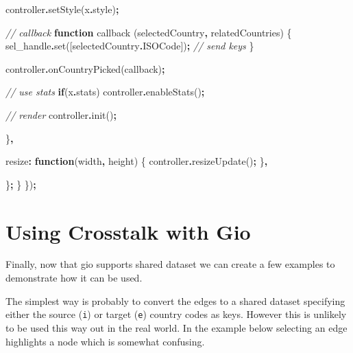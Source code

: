 \documentclass[
]{krantz}
\makeatletter
\newenvironment{Shaded}{\begin{snugshade}}{\end{snugshade}}
\newcommand{\AttributeTok}[1]{\textcolor[rgb]{0.61,0.61,0.61}{#1}}
\newcommand{\CommentTok}[1]{\textcolor[rgb]{0.37,0.37,0.37}{\textit{#1}}}
\newcommand{\ControlFlowTok}[1]{\textcolor[rgb]{0.27,0.27,0.27}{\textbf{#1}}}
\newcommand{\DataTypeTok}[1]{\textcolor[rgb]{0.27,0.27,0.27}{#1}}
\newcommand{\FunctionTok}[1]{\textcolor[rgb]{0,0,0}{#1}}
\newcommand{\KeywordTok}[1]{\textcolor[rgb]{0.27,0.27,0.27}{\textbf{#1}}}
\newcommand{\NormalTok}[1]{#1}
\newcommand{\OperatorTok}[1]{\textcolor[rgb]{0.43,0.43,0.43}{\textbf{#1}}}
\newenvironment{kframe}{%
\medskip{}
\setlength{\fboxsep}{.8em}
 \def\at@end@of@kframe{}%
 \ifinner\ifhmode%
  \def\at@end@of@kframe{\end{minipage}}%
  \begin{minipage}{\columnwidth}%
 \fi\fi%
 \def\FrameCommand##1{\hskip\@totalleftmargin \hskip-\fboxsep
 \colorbox{shadecolor}{##1}\hskip-\fboxsep
     \hskip-\linewidth \hskip-\@totalleftmargin \hskip\columnwidth}%
 \MakeFramed {\advance\hsize-\width
   \@totalleftmargin\z@ \linewidth\hsize
   \@setminipage}}%
 {\par\unskip\endMakeFramed%
 \at@end@of@kframe}
\renewenvironment{Shaded}{\begin{kframe}}{\end{kframe}}
\makeatother
\begin{document}
\begin{Shaded}
\begin{Highlighting}[]
\NormalTok{        controller}\OperatorTok{.}\FunctionTok{setStyle}\NormalTok{(x}\OperatorTok{.}\AttributeTok{style}\NormalTok{)}\OperatorTok{;}

        \CommentTok{// callback}
        \KeywordTok{function}\NormalTok{ callback (selectedCountry}\OperatorTok{,}\NormalTok{ relatedCountries) \{}
\NormalTok{          sel\_handle}\OperatorTok{.}\FunctionTok{set}\NormalTok{([selectedCountry}\OperatorTok{.}\AttributeTok{ISOCode}\NormalTok{])}\OperatorTok{;} \CommentTok{// send keys}
\NormalTok{        \}}

\NormalTok{        controller}\OperatorTok{.}\FunctionTok{onCountryPicked}\NormalTok{(callback)}\OperatorTok{;}

        \CommentTok{// use stats}
        \ControlFlowTok{if}\NormalTok{(x}\OperatorTok{.}\AttributeTok{stats}\NormalTok{)}
\NormalTok{          controller}\OperatorTok{.}\FunctionTok{enableStats}\NormalTok{()}\OperatorTok{;}

        \CommentTok{// render}
\NormalTok{        controller}\OperatorTok{.}\FunctionTok{init}\NormalTok{()}\OperatorTok{;}

\NormalTok{      \}}\OperatorTok{,}

      \DataTypeTok{resize}\OperatorTok{:} \KeywordTok{function}\NormalTok{(width}\OperatorTok{,}\NormalTok{ height) \{}
\NormalTok{        controller}\OperatorTok{.}\FunctionTok{resizeUpdate}\NormalTok{()}\OperatorTok{;}
\NormalTok{      \}}\OperatorTok{,}

\NormalTok{    \}}\OperatorTok{;}
\NormalTok{  \}}
\NormalTok{\})}\OperatorTok{;}
\end{Highlighting}
\end{Shaded}

\hypertarget{linking-widgets-using}{%
\section{Using Crosstalk with Gio}\label{linking-widgets-using}}

Finally, now that gio supports shared dataset we can create a few examples to demonstrate how it can be used.

The simplest way is probably to convert the edges to a shared dataset specifying either the source (\texttt{i}) or target (\texttt{e}) country codes as keys. However this is unlikely to be used this way out in the real world. In the example below selecting an edge highlights a node which is somewhat confusing.
\end{document}

